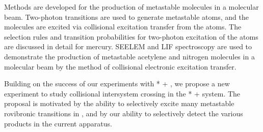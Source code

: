 


Methods are developed for the production of metastable molecules in a
molecular beam.  Two-photon transitions are used to generate
metastable atoms, and the molecules are excited via collisional
excitation transfer from the atoms.  The selection rules and
transition probabilities for two-photon excitation of the atoms are
discussed in detail for mercury.  SEELEM and LIF spectroscopy are used
to demonstrate the production of metastable acetylene and nitrogen
molecules in a molecular beam by the method of collisional electronic
excitation transfer.

Building on the success of our experiments with * + , we
propose a new experiment to study collisional intersystem crossing in
the * +  system.  The proposal is motivated by the
ability to selectively excite many metastable rovibronic transitions
in , and by our ability to selectively detect the various
products in the current apparatus.






